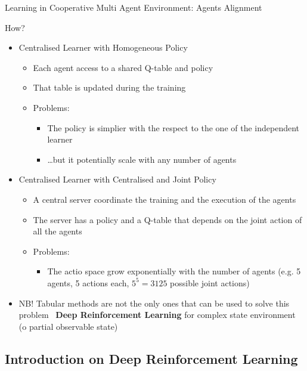 \documentclass[presentation, 8pt]{beamer}\mode<presentation>{\usetheme{AMSBolognaFC}}
\begin{document}
\begin{frame}[allowframebreaks]{Learning in Cooperative Multi Agent Environment: Agents Alignment}
\begin{alertblock}{How?}
\begin{itemize}
\begin{itemize}
\begin{itemize}
				\item It hardly scales with the number of agent
			\end{itemize}
		\end{itemize}
		\item Centralised Learner with Homogeneous Policy
		\begin{itemize}
			\item Each agent access to a shared Q-table and policy
			\item That table is updated during the training
			\item Problems:
			\begin{itemize}
				\item The policy is simplier with the respect to the one of the independent learner
				\item \dots but it potentially scale with any number of agents
			\end{itemize}
		\end{itemize}
		\item Centralised Learner with Centralised and Joint Policy
		\begin{itemize}
			\item A central server coordinate the training and the execution of the agents
			\item The server has a policy and a Q-table that depends on the joint action of all the agents
			\item Problems:
			\begin{itemize}
				\item The actio space grow exponentially with the number of agents (e.g. 5 agents, 5 actions each, $5^5=3125$ possible joint actions)
			\end{itemize}
		\end{itemize}
		\item NB! Tabular methods are not the only ones that can be used to solve this problem \faArrowRight \, \textbf{Deep Reinforcement Learning} for complex state environment (o partial observable state)
	\end{itemize}
\end{alertblock}
\end{frame}
\subsection{Introduction on Deep Reinforcement Learning}
\end{document}
